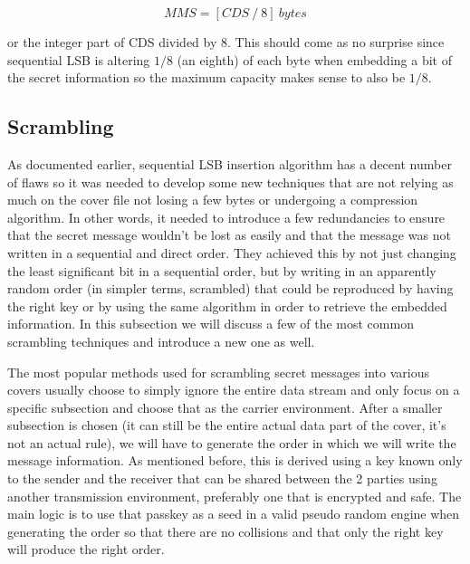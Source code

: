 \begin{multicols*}{2}
\[ MMS = [CDS \ / \ 8] \ bytes \]

or the integer part of CDS divided by 8. This should come as no surprise since sequential LSB is altering $1/8$ (an eighth) of each byte when embedding a bit of the secret information so the maximum capacity makes sense to also be $1/8$.


\subsection{Scrambling}
As documented earlier, sequential LSB insertion algorithm has a decent number of flaws so it was needed to develop some new techniques that are not relying as much on the cover file not losing a few bytes or undergoing a compression algorithm. In other words, it needed to introduce a few redundancies to ensure that the secret message wouldn't be lost as easily and that the message was not written in a sequential and direct order. They achieved this by not just changing the least significant bit in a sequential order, but by writing in an apparently random order (in simpler terms, scrambled) that could be reproduced by having the right key or by using the same algorithm in order to retrieve the embedded information. In this subsection we will discuss a few of the most common scrambling techniques and introduce a new one as well.

The most popular methods used for scrambling secret messages into various covers usually choose to simply ignore the entire data stream and only focus on a specific subsection and choose that as the carrier environment. After a smaller subsection is chosen (it can still be the entire actual data part of the cover, it's not an actual rule), we will have to generate the order in which we will write the message information. As mentioned before, this is derived using a key known only to the sender and the receiver that can be shared between the 2 parties using another transmission environment, preferably one that is encrypted and safe. The main logic is to use that passkey as a seed in a valid pseudo random engine when generating the order so that there are no collisions and that only the right key will produce the right order. 


\end{multicols*}
